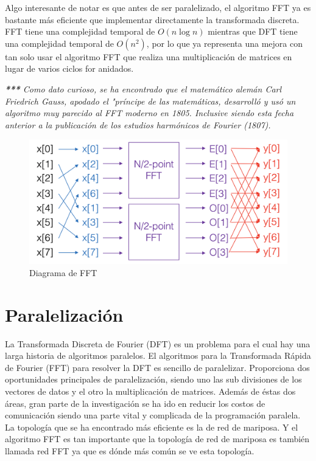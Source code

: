 \documentclass{report}
\begin{document}
Algo interesante de notar es que antes de ser paralelizado, el algoritmo FFT ya es bastante más eficiente que implementar directamente la transformada discreta. FFT tiene una complejidad temporal de $O(n\log n)$ mientras que DFT tiene una complejidad temporal de $O(n^2)$, por lo que ya representa una mejora con tan solo usar el algoritmo FFT que realiza una multiplicación de matrices en lugar de varios ciclos for anidados.\medskip

\vfill

\noindent
\textit{\textbf{***} Como dato curioso, se ha encontrado que el matemático alemán Carl Friedrich Gauss, apodado el "príncipe de las matemáticas, desarrolló y usó un algoritmo muy parecido al FFT moderno en 1805. Inclusive siendo esta fecha anterior a la publicación de los estudios harmónicos de Fourier (1807).}

\begin{figure}[h!]
    \begin{center}
        \includegraphics[width=\textwidth]{Images/fft_diagram.png}
        \caption{Diagrama de FFT}
    \end{center}
\end{figure}

\clearpage

\section*{Paralelización}
\noindent La Transformada Discreta de Fourier (DFT) es un problema para el cual hay una larga historia de algoritmos paralelos. El algoritmos para la Transformada Rápida de Fourier (FFT) para resolver la DFT es sencillo de paralelizar. Proporciona dos oportunidades principales de paralelización, siendo uno las sub divisiones de los vectores de datos y el otro la multiplicación de matrices. Además de éstas dos áreas, gran parte de la investigación se ha ido en reducir los costos de comunicación siendo una parte vital y complicada de la programación paralela. La topología que se ha encontrado más eficiente es la de red de mariposa. Y el algoritmo FFT es tan importante que la topología de red de mariposa es también llamada red FFT ya que es dónde más común se ve esta topología.
\end{document}
